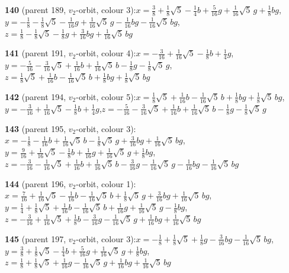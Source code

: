\documentclass[10pt]{article}
\begin{document}
{\noindent\textbf{140} (parent 189, $v_2$-orbit, colour 3):\quad $x=\tfrac{3}{8}+\tfrac{1}{8}\sqrt5-\tfrac{1}{4}b+\tfrac{5}{16}g+\tfrac{1}{16}\sqrt5\,g+\tfrac{1}{8}bg$,\quad $y=-\tfrac{1}{8}-\tfrac{1}{8}\sqrt5-\tfrac{1}{16}g+\tfrac{1}{16}\sqrt5\,g-\tfrac{1}{16}bg-\tfrac{1}{16}\sqrt5\,bg$,\quad $z=\tfrac{1}{8}-\tfrac{1}{8}\sqrt5-\tfrac{1}{8}g+\tfrac{3}{16}bg+\tfrac{1}{16}\sqrt5\,bg$\par\smallskip
\noindent\textbf{141} (parent 191, $v_2$-orbit, colour 4):\quad $x=-\tfrac{3}{16}+\tfrac{1}{16}\sqrt5-\tfrac{1}{8}b+\tfrac{1}{4}g$,\quad $y=-\tfrac{5}{16}-\tfrac{3}{16}\sqrt5+\tfrac{1}{16}b+\tfrac{1}{16}\sqrt5\,b-\tfrac{1}{8}g-\tfrac{1}{8}\sqrt5\,g$,\quad $z=\tfrac{1}{8}\sqrt5+\tfrac{1}{16}b-\tfrac{1}{16}\sqrt5\,b+\tfrac{1}{8}bg+\tfrac{1}{8}\sqrt5\,bg$\par\smallskip
\noindent\textbf{142} (parent 194, $v_2$-orbit, colour 5):\quad $x=\tfrac{1}{8}\sqrt5+\tfrac{1}{16}b-\tfrac{1}{16}\sqrt5\,b+\tfrac{1}{8}bg+\tfrac{1}{8}\sqrt5\,bg$,\quad $y=-\tfrac{3}{16}+\tfrac{1}{16}\sqrt5-\tfrac{1}{8}b+\tfrac{1}{4}g$,\quad $z=-\tfrac{5}{16}-\tfrac{3}{16}\sqrt5+\tfrac{1}{16}b+\tfrac{1}{16}\sqrt5\,b-\tfrac{1}{8}g-\tfrac{1}{8}\sqrt5\,g$\par\smallskip
\noindent\textbf{143} (parent 195, $v_2$-orbit, colour 3):\quad $x=-\tfrac{1}{8}-\tfrac{1}{16}b+\tfrac{1}{16}\sqrt5\,b-\tfrac{1}{8}\sqrt5\,g+\tfrac{3}{16}bg+\tfrac{1}{16}\sqrt5\,bg$,\quad $y=\tfrac{9}{16}+\tfrac{1}{16}\sqrt5-\tfrac{1}{8}b+\tfrac{1}{16}g+\tfrac{1}{16}\sqrt5\,g+\tfrac{1}{8}bg$,\quad $z=-\tfrac{3}{16}-\tfrac{1}{16}\sqrt5+\tfrac{1}{16}b+\tfrac{1}{16}\sqrt5\,b-\tfrac{3}{16}g-\tfrac{1}{16}\sqrt5\,g-\tfrac{1}{16}bg-\tfrac{1}{16}\sqrt5\,bg$\par\smallskip
\noindent\textbf{144} (parent 196, $v_2$-orbit, colour 1):\quad $x=\tfrac{7}{16}+\tfrac{1}{16}\sqrt5-\tfrac{1}{16}b-\tfrac{1}{16}\sqrt5\,b+\tfrac{1}{8}\sqrt5\,g+\tfrac{3}{16}bg+\tfrac{1}{16}\sqrt5\,bg$,\quad $y=\tfrac{1}{4}+\tfrac{1}{8}\sqrt5+\tfrac{1}{16}b-\tfrac{1}{16}\sqrt5\,b+\tfrac{1}{16}g+\tfrac{1}{16}\sqrt5\,g-\tfrac{1}{8}bg$,\quad $z=-\tfrac{3}{16}+\tfrac{1}{16}\sqrt5+\tfrac{1}{8}b-\tfrac{3}{16}g-\tfrac{1}{16}\sqrt5\,g+\tfrac{1}{16}bg+\tfrac{1}{16}\sqrt5\,bg$\par\smallskip
\noindent\textbf{145} (parent 197, $v_2$-orbit, colour 3):\quad $x=-\tfrac{1}{8}+\tfrac{1}{8}\sqrt5+\tfrac{1}{8}g-\tfrac{3}{16}bg-\tfrac{1}{16}\sqrt5\,bg$,\quad $y=\tfrac{3}{8}+\tfrac{1}{8}\sqrt5-\tfrac{1}{4}b+\tfrac{5}{16}g+\tfrac{1}{16}\sqrt5\,g+\tfrac{1}{8}bg$,\quad $z=\tfrac{1}{8}+\tfrac{1}{8}\sqrt5+\tfrac{1}{16}g-\tfrac{1}{16}\sqrt5\,g+\tfrac{1}{16}bg+\tfrac{1}{16}\sqrt5\,bg$\par\smallskip
}
\end{document}

